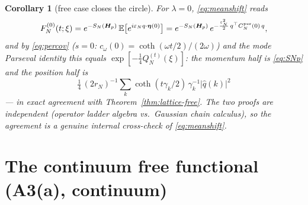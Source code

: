 \documentclass[11pt,a4paper]{article}
\theoremstyle{plain}
\newtheorem{corollary}[theorem]{Corollary}
\theoremstyle{definition}
\newcommand{\E}{\mathbb{E}}
\newcommand{\eps}{\varepsilon}
\DeclareMathOperator{\cth}{coth}
\begin{document}
\begin{corollary}[free case closes the circle]\label{cor:freecircle}
For $\lambda=0$, \eqref{eq:meanshift} reads
\[
 F^{(0)}_N(t;\xi)=e^{-S_N(\bm H_p)}\,
 \E\bigl[e^{i\eps_Nq\cdot\bm\eta(0)}\bigr]
 =e^{-S_N(\bm H_p)}\,e^{-\frac{\eps_N^2}2\,q^\top C^{\rm per}_N(0)\,q},
\]
and by
\eqref{eq:percov} ($s=0$: $c_\omega(0)=\cth(\omega t/2)/(2\omega)$) and the
mode Parseval identity this equals
$\exp[-\tfrac14Q^{(t)}_N(\xi)]$: the momentum half is \eqref{eq:SNp} and the
position half is
\[
 \tfrac14\,(2r_N)^{-1}\textstyle\sum_k
 \cth(t\gamma_k/2)\,\gamma_k^{-1}|\widehat q(k)|^2
\]
--- in exact agreement with Theorem~\ref{thm:lattice-free}. The two proofs are
independent (operator ladder algebra vs.\ Gaussian chain calculus), so the
agreement is a genuine internal cross-check of \eqref{eq:meanshift}.
\end{corollary}

\section{The continuum free functional (A3(a), continuum)}\label{sec:cont}
\end{document}
